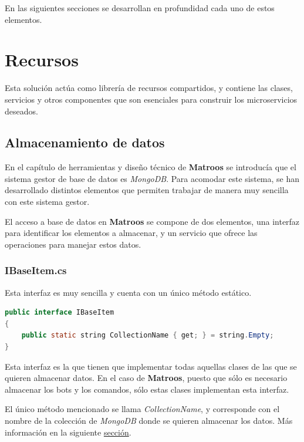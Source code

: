 En las siguientes secciones se desarrollan en profundidad cada uno de estos elementos.









\section{Recursos}

Esta solución actúa como librería de recursos compartidos, y contiene las clases, servicios y otros componentes que son esenciales para construir los microservicios deseados.

\subsection{Almacenamiento de datos}

En el capítulo de herramientas y diseño técnico de \textbf{Matroos} se introducía que el sistema gestor de base de datos es \textit{MongoDB}. Para acomodar este sistema, se han desarrollado distintos elementos que permiten trabajar de manera muy sencilla con este sistema gestor.

El acceso a base de datos en \textbf{Matroos} se compone de dos elementos, una interfaz para identificar los elementos a almacenar, y un servicio que ofrece las operaciones para manejar estos datos.

\subsubsection{IBaseItem.cs}

Esta interfaz es muy sencilla y cuenta con un único método estático.

\begin{lstlisting}[language=java]
public interface IBaseItem
{
    public static string CollectionName { get; } = string.Empty;
}
\end{lstlisting}

Esta interfaz es la que tienen que implementar todas aquellas clases de las que se quieren almacenar datos. En el caso de \textbf{Matroos}, puesto que sólo es necesario almacenar los bots y los comandos, sólo estas clases implementan esta interfaz.

El único método mencionado se llama \textit{CollectionName}, y corresponde con el nombre de la colección de \textit{MongoDB} donde se quieren almacenar los datos. Más información en la siguiente \hyperref[sec:datacontextservice]{sección}.

